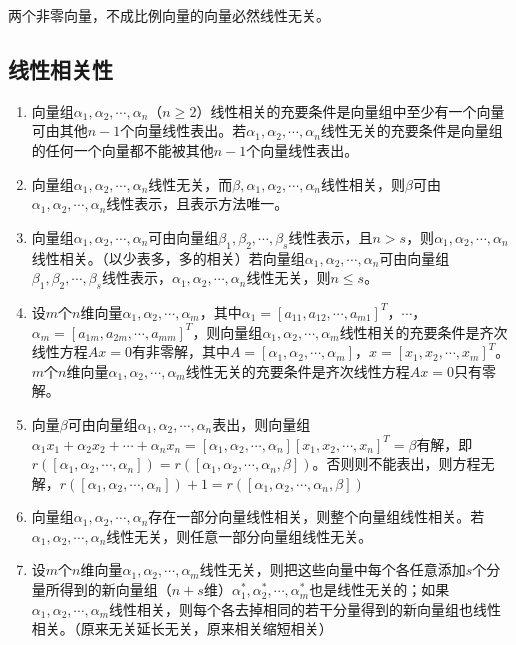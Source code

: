 \documentclass[UTF8, 12pt]{ctexart}
\begin{document}
两个非零向量，不成比例向量的向量必然线性无关。

\subsection{线性相关性}

\begin{enumerate}
    \item 向量组$\alpha_1,\alpha_2,\cdots,\alpha_n$（$n\geqslant2$）线性相关的充要条件是向量组中至少有一个向量可由其他$n-1$个向量线性表出。若$\alpha_1,\alpha_2,\cdots,\alpha_n$线性无关的充要条件是向量组的任何一个向量都不能被其他$n-1$个向量线性表出。
    \item 向量组$\alpha_1,\alpha_2,\cdots,\alpha_n$线性无关，而$\beta,\alpha_1,\alpha_2,\cdots,\alpha_n$线性相关，则$\beta$可由$\alpha_1,\alpha_2,\cdots,\alpha_n$线性表示，且表示方法唯一。
    \item 向量组$\alpha_1,\alpha_2,\cdots,\alpha_n$可由向量组$\beta_1,\beta_2,\cdots,\beta_s$线性表示，且$n>s$，则$\alpha_1,\alpha_2,\cdots,\alpha_n$线性相关。（以少表多，多的相关）若向量组$\alpha_1,\alpha_2,\cdots,\alpha_n$可由向量组$\beta_1,\beta_2,\cdots,\beta_s$线性表示，$\alpha_1,\alpha_2,\cdots,\alpha_n$线性无关，则$n\leqslant s$。
    \item 设$m$个$n$维向量$\alpha_1,\alpha_2,\cdots,\alpha_m$，其中$\alpha_1=[a_{11},a_{12},\cdots,a_{m1}]^T$，$\cdots$，$\alpha_m=[a_{1m},a_{2m},\cdots,a_{mm}]^T$，则向量组$\alpha_1,\alpha_2,\cdots,\alpha_m$线性相关的充要条件是齐次线性方程$Ax=0$有非零解，其中$A=[\alpha_1,\alpha_2,\cdots,\alpha_m]$，$x=[x_1,x_2,\cdots,x_m]^T$。$m$个$n$维向量$\alpha_1,\alpha_2,\cdots,\alpha_m$线性无关的充要条件是齐次线性方程$Ax=0$只有零解。
    \item 向量$\beta$可由向量组$\alpha_1,\alpha_2,\cdots,\alpha_n$表出，则向量组$\alpha_1x_1+\alpha_2x_2+\cdots+\alpha_nx_n=[\alpha_1,\alpha_2,\cdots,\alpha_n][x_1,x_2,\cdots,x_n]^T=\beta$有解，即$r([\alpha_1,\alpha_2,\cdots,\alpha_n])=r([\alpha_1,\alpha_2,\cdots,\alpha_n,\beta])$。否则则不能表出，则方程无解，$r([\alpha_1,\alpha_2,\cdots,\alpha_n])+1=r([\alpha_1,\alpha_2,\cdots,\alpha_n,\beta])$
    \item 向量组$\alpha_1,\alpha_2,\cdots,\alpha_n$存在一部分向量线性相关，则整个向量组线性相关。若$\alpha_1,\alpha_2,\cdots,\alpha_n$线性无关，则任意一部分向量组线性无关。
    \item 设$m$个$n$维向量$\alpha_1,\alpha_2,\cdots,\alpha_m$线性无关，则把这些向量中每个各任意添加$s$个分量所得到的新向量组（$n+s$维）$\alpha_1^*,\alpha_2^*,\cdots,\alpha_m^*$也是线性无关的；如果$\alpha_1,\alpha_2,\cdots,\alpha_m$线性相关，则每个各去掉相同的若干分量得到的新向量组也线性相关。（原来无关延长无关，原来相关缩短相关）
\end{enumerate}
\end{document}

